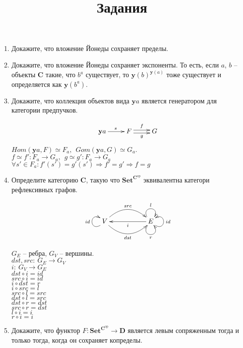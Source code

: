 \documentclass[draft]{article}
\newcommand{\cat}[1]{\mathbf{#1}}
\renewcommand{\C}{\cat{C}}
\newcommand{\D}{\cat{D}}
\newcommand{\y}{\cat{y}}
\newcommand{\Set}{\cat{Set}}
\newcommand{\fs}[1]{\mathrm{#1}}
\newcommand{\op}{\fs{op}}
\begin{document}
\title{Задания}
\maketitle

\begin{enumerate}

\item Докажите, что вложение Йонеды сохраняет пределы.

\item Докажите, что вложение Йонеды сохраняет экспоненты. То есть, если $a$, $b$ -- объекты $\C$ такие, что $b^a$ существует,
то $\y(b)^{\y(a)}$ тоже существует и определяется как $\y(b^a)$.

\item Докажите, что коллекция объектов вида $\y a$ является генератором для категории предпучков.

\[\xymatrix{ \y a \ar[r]^{s} & F \ar@<+0.5ex>[r]^{f} \ar@<-0.5ex>[r]_{g}  & G } \]
$Hom(\y a, F) \simeq F_a,~~Gom(\y a, G) \simeq G_a$.\\
$f \simeq f': F_a \to G_a, ~~g \simeq g': F_a \to G_a$\\
$\forall s' \in F_a: f'(s') = g'(s') \Rightarrow f' = g' \Rightarrow f = g$

\item Определите категорию $\C$, такую что $\Set^{\C^\op}$ эквивалентна категори рефлексивных графов.

\[
\xymatrix{
	V 
	\ar@(ld,lu)^{id}
	\ar@/^1.5pc/[rr]^{src}
	\ar@/_1.5pc/[rr]_{dst}
	&& 
	E 
	\ar@(rd,ru)_{id}	
	\ar@(ul,ur)^{l}	
	\ar@(dl,dr)_{r}	
	\ar[ll]^{i}
}
\]

$G_E$ -- ребра, $G_V$ -- вершины.\\
$dst, src: ~G_E \to G_V$ \\
$i: ~G_V \to G_E$\\
$dst \circ i = id$\\
$src \circ i = id$\\
$i \circ dst = r$\\
$i \circ src = l$\\
$src \circ l = src$\\
$dst \circ l = src$\\
$dst \circ r = dst$\\
$src \circ r = dst$\\
$l \circ i = i$\\
$r \circ i = i$


\item Докажите, что функтор $F : \Set^{\C^\op} \to \D$ является левым сопряженным тогда и только тогда, когда он сохраняет копределы.


\end{enumerate}
\end{document}
